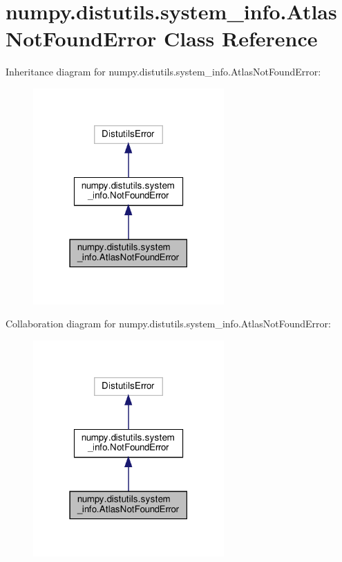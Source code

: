 \hypertarget{classnumpy_1_1distutils_1_1system__info_1_1AtlasNotFoundError}{}\section{numpy.\+distutils.\+system\+\_\+info.\+Atlas\+Not\+Found\+Error Class Reference}
\label{classnumpy_1_1distutils_1_1system__info_1_1AtlasNotFoundError}


Inheritance diagram for numpy.\+distutils.\+system\+\_\+info.\+Atlas\+Not\+Found\+Error\+:
\nopagebreak
\begin{figure}[H]
\begin{center}
\leavevmode
\includegraphics[width=207pt]{classnumpy_1_1distutils_1_1system__info_1_1AtlasNotFoundError__inherit__graph}
\end{center}
\end{figure}


Collaboration diagram for numpy.\+distutils.\+system\+\_\+info.\+Atlas\+Not\+Found\+Error\+:
\nopagebreak
\begin{figure}[H]
\begin{center}
\leavevmode
\includegraphics[width=207pt]{classnumpy_1_1distutils_1_1system__info_1_1AtlasNotFoundError__coll__graph}
\end{center}
\end{figure}


